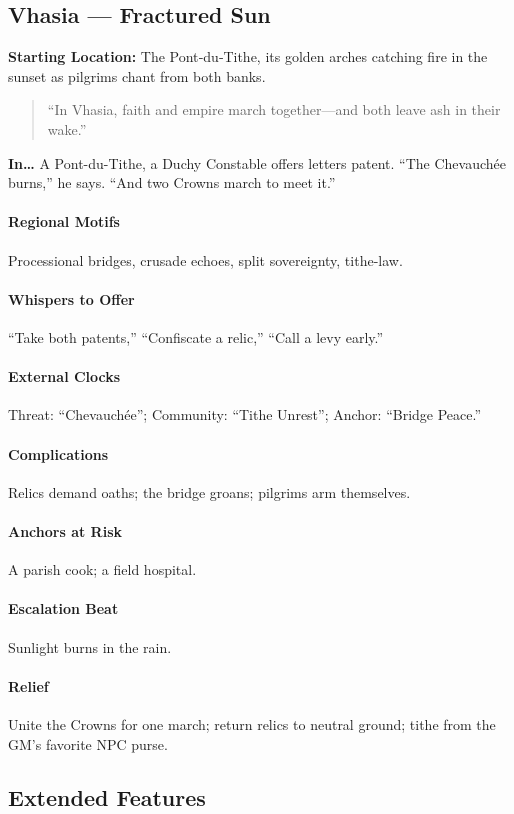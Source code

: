 \subsection*{Vhasia — Fractured Sun}
\textbf{Starting Location:} The Pont‑du‑Tithe, its golden arches catching fire in the sunset as pilgrims chant from both banks.
\begin{quote}
“In Vhasia, faith and empire march together—and both leave ash in their wake.”
\end{quote}

\textbf{In…} A Pont-du-Tithe, a Duchy Constable offers letters patent. ``The Chevauchée burns,'' he says. ``And two Crowns march to meet it.''
\paragraph{Regional Motifs} Processional bridges, crusade echoes, split sovereignty, tithe-law.
\paragraph{Whispers to Offer} ``Take both patents,'' ``Confiscate a relic,'' ``Call a levy early.''
\paragraph{External Clocks} Threat: ``Chevauchée''; Community: ``Tithe Unrest''; Anchor: ``Bridge Peace.''
\paragraph{Complications} Relics demand oaths; the bridge groans; pilgrims arm themselves.
\paragraph{Anchors at Risk} A parish cook; a field hospital.
\paragraph{Escalation Beat} Sunlight burns in the rain.
\paragraph{Relief} Unite the Crowns for one march; return relics to neutral ground; tithe from the GM’s favorite NPC purse.

\subsection*{Extended Features}
\label{sec:vhasia-extended}

